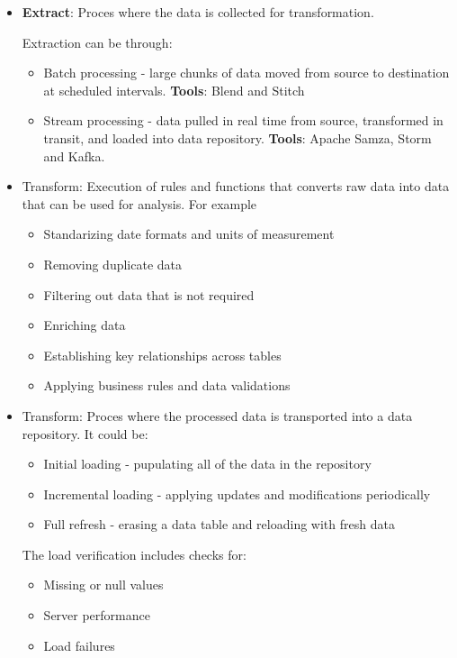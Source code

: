 \documentclass[../../ibm_data_analysis.tex]{subfiles}
\begin{document}
    \begin{itemize}
        \item \textbf{Extract}: Proces where the data is collected for transformation.
        
        Extraction can be through:
        \begin{itemize}
            \item Batch processing - large chunks of data moved from source to destination at scheduled intervals. \textbf{Tools}: Blend and Stitch
            \item Stream processing - data pulled in real time from source, transformed in transit, and loaded into data repository. \textbf{Tools}: Apache Samza, Storm and Kafka.
        \end{itemize}
        \item Transform: Execution of rules and functions that converts raw data into data that can be used for analysis. For example
        \begin{itemize}
            \item Standarizing date formats and units of measurement
            \item Removing duplicate data
            \item Filtering out data that is not required
            \item Enriching data
            \item Establishing key relationships across tables
            \item Applying business rules and data validations
        \end{itemize}

        \item Transform: Proces where the processed data is transported into a data repository. It could be:
        \begin{itemize}
            \item Initial loading - pupulating all of the data in the repository
            \item Incremental loading - applying updates and modifications periodically
            \item Full refresh - erasing a data table and reloading with fresh data
        \end{itemize}

        The load verification includes checks for:
        \begin{itemize}
            \item Missing or null values
            \item Server performance
            \item Load failures
        \end{itemize}
    \end{itemize}
\end{document}

